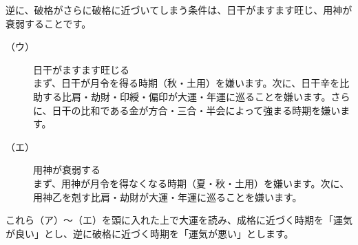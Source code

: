 \documentclass[a5paper,11pt,dvipdfmx]{tarticle}
\begin{document}
逆に、破格がさらに破格に近づいてしまう条件は、日干がますます旺じ、用神が衰弱することです。
\begin{description}
\item[（ウ）] 日干がますます旺じる\\
まず、日干が月令を得る時期（秋・土用）を嫌います。次に、日干辛を比助する比肩・劫財・印綬・偏印が大運・年運に巡ることを嫌います。さらに、日干の比和である金が方合・三合・半会によって強まる時期を嫌います。
\item[（エ）] 用神が衰弱する\\
まず、用神が月令を得なくなる時期（夏・秋・土用）を嫌います。次に、用神乙を剋す比肩・劫財が大運・年運に巡ることを嫌います。
\end{description}

これら（ア）〜（エ）を頭に入れた上で大運を読み、成格に近づく時期を「運気が良い」とし、逆に破格に近づく時期を「運気が悪い」とします。
\end{document}

